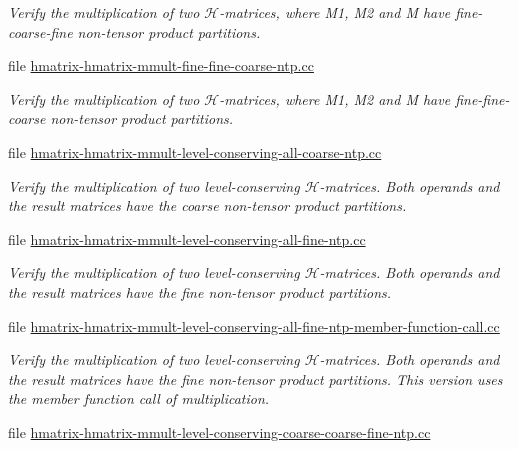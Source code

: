 \begin{DoxyCompactItemize}
\begin{DoxyCompactList}\small\item\em Verify the multiplication of two $\mathcal{H}$-\/matrices, where M1, M2 and M have fine-\/coarse-\/fine non-\/tensor product partitions. \end{DoxyCompactList}\item 
file \hyperlink{hmatrix-hmatrix-mmult-fine-fine-coarse-ntp_8cc}{hmatrix-\/hmatrix-\/mmult-\/fine-\/fine-\/coarse-\/ntp.\+cc}
\begin{DoxyCompactList}\small\item\em Verify the multiplication of two $\mathcal{H}$-\/matrices, where M1, M2 and M have fine-\/fine-\/coarse non-\/tensor product partitions. \end{DoxyCompactList}\item 
file \hyperlink{hmatrix-hmatrix-mmult-level-conserving-all-coarse-ntp_8cc}{hmatrix-\/hmatrix-\/mmult-\/level-\/conserving-\/all-\/coarse-\/ntp.\+cc}
\begin{DoxyCompactList}\small\item\em Verify the multiplication of two level-\/conserving $\mathcal{H}$-\/matrices. Both operands and the result matrices have the coarse non-\/tensor product partitions. \end{DoxyCompactList}\item 
file \hyperlink{hmatrix-hmatrix-mmult-level-conserving-all-fine-ntp_8cc}{hmatrix-\/hmatrix-\/mmult-\/level-\/conserving-\/all-\/fine-\/ntp.\+cc}
\begin{DoxyCompactList}\small\item\em Verify the multiplication of two level-\/conserving $\mathcal{H}$-\/matrices. Both operands and the result matrices have the fine non-\/tensor product partitions. \end{DoxyCompactList}\item 
file \hyperlink{hmatrix-hmatrix-mmult-level-conserving-all-fine-ntp-member-function-call_8cc}{hmatrix-\/hmatrix-\/mmult-\/level-\/conserving-\/all-\/fine-\/ntp-\/member-\/function-\/call.\+cc}
\begin{DoxyCompactList}\small\item\em Verify the multiplication of two level-\/conserving $\mathcal{H}$-\/matrices. Both operands and the result matrices have the fine non-\/tensor product partitions. This version uses the member function call of multiplication. \end{DoxyCompactList}\item 
file \hyperlink{hmatrix-hmatrix-mmult-level-conserving-coarse-coarse-fine-ntp_8cc}{hmatrix-\/hmatrix-\/mmult-\/level-\/conserving-\/coarse-\/coarse-\/fine-\/ntp.\+cc}

\end{DoxyCompactItemize}

